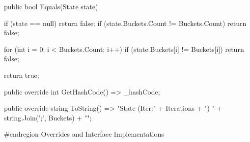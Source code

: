 \documentclass[a4paper,10pt,ngerman]{scrartcl}
\begin{document}
\begin{lstcs}
{        public bool Equals(State state)
        {
            if (state == null) return false;
            if (state.Buckets.Count != Buckets.Count) return false;

            for (int i = 0; i < Buckets.Count; i++)
            {
                if (state.Buckets[i] != Buckets[i]) return false;
            }

            return true;
        }

        public override int GetHashCode() => _hashCode;

        public override string ToString() => "State (Iter:" + Iterations + ") {" + string.Join(';', Buckets) + "}";

        #endregion Overrides and Interface Implementations
    }
\end{lstcs}
\end{document}
